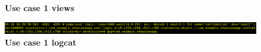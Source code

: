 \begin{figure}[h!]
  \caption{\label{fig:seapp_uc1_views}\bf Use case 1 views}
\end{figure}

\begin{figure}[h!]
  \centering
  \includegraphics[width=\textwidth]{chapters/seapp/figs/ae/UseCase1Logcat.png}
  \caption{\label{fig:seapp_uc1_logcat}\bf Use case 1 logcat}  
\end{figure}

\newpage
      

